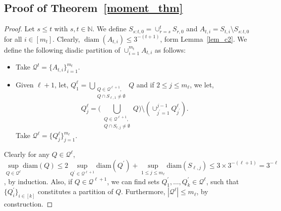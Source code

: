 \documentclass[12pts]{article}
\newcommand{\sQ}{ \mathscr{Q}}
\newcommand{\fN}{\mathbb{N}}
\begin{document}
 
\subsection{Proof of Theorem~\ref{moment_thm}}

\begin{proof}
Let $s \le t$ with $s, t \in \fN$. We define $S_{s:t, 0} = \cup_{r=s}^t S_{r,0}$ and  $A_{t, i} = S_{t, i } \setminus S_{s:t, 0}$ for all $i \in [m_t]$. Clearly, $\operatorname{diam}(A_{t,i}) \le 3^{-(t+1)}$, form Lemma~\ref{lem_c2}. We define the following diadic partition of $\cup_{i=1}^{m_t} A_{t, i}$ as follows:

\begin{itemize}
    \item Take $\sQ^t = \{A_{t,i}\}_{i=1}^{m_t}$.
    \item Given $\ell+1$, let, \(Q^\ell_1 = \bigcup_{\substack{Q \in \sQ^{\ell+1}, \\ Q \cap S_{\ell,1} \neq \emptyset  }}Q  \) and if $2 \le j \le m_{\ell}$, we let, \[Q^\ell_j = \bigg(\bigcup_{\substack{ Q \in \sQ^{\ell+1}, \\ Q \cap S_{r,j} \neq \emptyset}}
     Q\bigg) \setminus \left(\cup_{j^\prime = 1}^{j-1} Q_{j^\prime}^\ell\right).\] Take $\sQ^\ell = \{Q^{\ell}_j\}_{j=1}^{m_\ell}$.
\end{itemize}
 Clearly for any $Q \in \sQ^\ell$, $\sup\limits_{Q \in \sQ^\ell}\text{diam}(Q) \le 2 \sup\limits_{Q^\prime \in \sQ^{\ell+1}} \text{diam}(Q^\prime) + \sup\limits_{1 \le j \le m_\ell}\text{diam}(S_{\ell,j}) \le 3 \times 3^{-(\ell+1)} = 3^{-\ell}$, by induction. Also, if $Q \in \sQ^{\ell+1}$, we can find sets $Q^\prime_1, \dots, Q^\prime_k \in \sQ^\ell$, such that $ \{Q^\prime_i\}_{i \in [k]}$ constitutes a partition of $Q$. Furthermore, $|\sQ^\ell| \le m_\ell$, by construction.


\end{proof}
\end{document}

